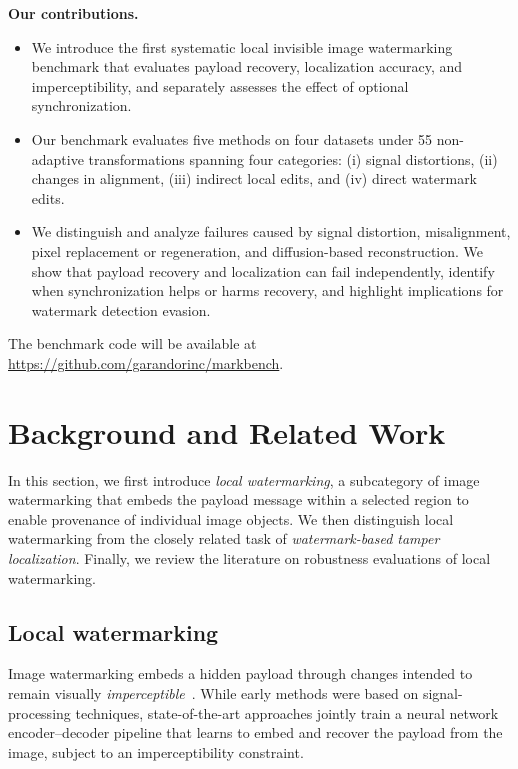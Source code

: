 \documentclass[sigconf,nonacm]{acmart}
\begin{document}
\smallskip
\noindent\textbf{Our contributions.}
\begin{itemize}[leftmargin=*]
    \item We introduce the first systematic local invisible image watermarking benchmark that evaluates payload recovery, localization accuracy, and imperceptibility, and separately assesses the effect of optional synchronization.
    \item Our benchmark evaluates five methods on four datasets under 55 non-adaptive transformations spanning four categories: (i) signal distortions, (ii) changes in alignment, (iii) indirect local edits, and (iv) direct watermark edits.
    \item We distinguish and analyze failures caused by signal distortion, misalignment, pixel replacement or regeneration, and diffusion-based reconstruction. We show that payload recovery and localization can fail independently, identify when synchronization helps or harms recovery, and highlight implications for watermark detection evasion.
\end{itemize}
The benchmark code will be available at \url{https://github.com/garandorinc/markbench}.




\section{Background and Related Work}
\label{sec:background}

In this section, we first introduce \emph{local watermarking}, a subcategory of image watermarking that embeds the payload message within a selected region to enable provenance of individual image objects. We then distinguish local watermarking from the closely related task of \emph{watermark-based tamper localization}. Finally, we review the literature on robustness evaluations of local watermarking.

\subsection{Local watermarking}
\label{subsec:local_watermarking}

Image watermarking embeds a hidden payload through changes intended to remain visually {\it imperceptible}~\cite{cox1997secure,hartung1999multimedia,cayre2005watermarking}. While early methods were based on signal-processing techniques, state-of-the-art approaches jointly train a neural network encoder--decoder pipeline that learns to embed and recover the payload from the image, subject to an imperceptibility constraint.
\end{document}
